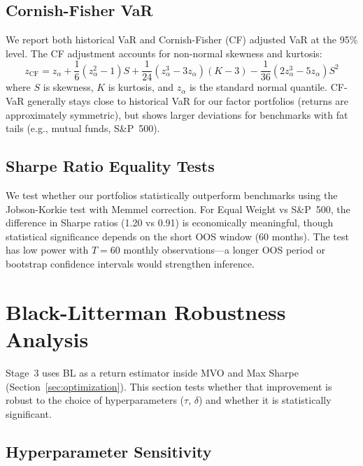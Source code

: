 \documentclass[12pt,a4paper]{article}
\begin{document}
\subsection{Cornish-Fisher VaR}

We report both historical VaR and Cornish-Fisher (CF) adjusted VaR at the 95\% level. The CF adjustment accounts for non-normal skewness and kurtosis:
\begin{equation}
    z_{\text{CF}} = z_\alpha + \frac{1}{6}(z_\alpha^2 - 1)S + \frac{1}{24}(z_\alpha^3 - 3z_\alpha)(K-3) - \frac{1}{36}(2z_\alpha^3 - 5z_\alpha)S^2
\end{equation}
where $S$ is skewness, $K$ is kurtosis, and $z_\alpha$ is the standard normal quantile. CF-VaR generally stays close to historical VaR for our factor portfolios (returns are approximately symmetric), but shows larger deviations for benchmarks with fat tails (e.g., mutual funds, S\&P~500).

\subsection{Sharpe Ratio Equality Tests}

We test whether our portfolios statistically outperform benchmarks using the Jobson-Korkie test with Memmel correction. For Equal Weight vs S\&P~500, the difference in Sharpe ratios (1.20 vs 0.91) is economically meaningful, though statistical significance depends on the short OOS window (60 months). The test has low power with $T=60$ monthly observations---a longer OOS period or bootstrap confidence intervals would strengthen inference.

\section{Black-Litterman Robustness Analysis}
\label{sec:bl}

Stage~3 uses BL as a return estimator inside MVO and Max Sharpe (Section~\ref{sec:optimization}). This section tests whether that improvement is robust to the choice of hyperparameters ($\tau$, $\delta$) and whether it is statistically significant.

\subsection{Hyperparameter Sensitivity}
\end{document}
